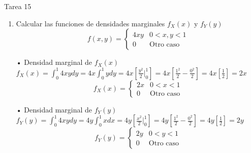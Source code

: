 \documentclass[a4paper, 12pt]{article}
\newcommand{\Aspace}{0.2cm}
\begin{document}
    \newpage
    \vspace{0.3cm}

    \begin{center}
        { \LARGE Tarea 15}
    \end{center}

    \begin{enumerate}
        \item Calcular las funciones de densidades marginales $f_{X}(x)$ y $f_{Y}(y)$
        \[
            f(x, y) =
            \begin{cases}
                4xy     &   0 < x, y < 1    \\
                0       &   \text{Otro caso}
            \end{cases}
        \]
            \vspace{\Aspace}
            { \color{azul}  
                \par • Densidad marginal de $f_{X}(x)$ \\
                \(
                    f_{X}(x)
                    = \int_{0}^{1} 4xydy
                    = 4x \int_{0}^{1} ydy
                    = 4x \left[ \frac{y^{2}}{2} \Big|_{0}^{1} \right]
                    = 4x \left[ \frac{1^{2}}{2} - \frac{0^{2}}{2} \right]
                    = 4x \left[ \frac{1}{2} \right]
                    = 2x
                \)
                \[
                    f_{X}(x) =
                    \begin{cases}
                        2x  &   0 < x < 1 \\
                        0   &   \text{Otro caso}
                    \end{cases}
                \]

                \par • Densidad marginal de $f_{Y}(y)$ \\
                \(
                    f_{Y}(y)
                    = \int_{0}^{1} 4xydy
                    = 4y \int_{0}^{1} xdx
                    = 4y \left[ \frac{x^{2}}{2} \Big|_{0}^{1} \right]
                    = 4y \left[ \frac{1^{2}}{2} - \frac{0^{2}}{2} \right]
                    = 4y \left[ \frac{1}{2} \right]
                    = 2y
                \)
                \[
                    f_{Y}(y) =
                    \begin{cases}
                        2y  &   0 < y < 1 \\
                        0   &   \text{Otro caso}
                    \end{cases}
                \]
            }
        


\end{enumerate}
\end{document}
